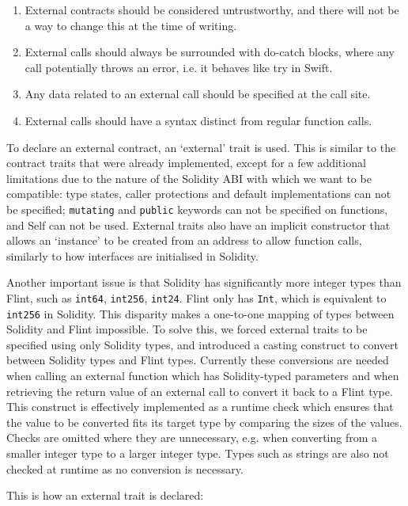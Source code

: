 \begin{enumerate}
	\item External contracts should be considered untrustworthy, and there will not be a way to change this at the time of writing.
	\item External calls should always be surrounded with do-catch blocks, where any call potentially throws an error, i.e. it behaves like try in Swift.
	\item Any data related to an external call should be specified at the call site.
	\item External calls should have a syntax distinct from regular function calls.
\end{enumerate}

To declare an external contract, an `external' trait is used. This is similar to the contract traits that were already implemented, except for a few additional limitations due to the nature of the Solidity ABI with which we want to be compatible: type states, caller protections and default implementations can not be specified; \texttt{mutating} and \texttt{public} keywords can not be specified on functions, and Self can not be used. External traits also have an implicit constructor that allows an `instance' to be created from an address to allow function calls, similarly to how interfaces are initialised in Solidity.

Another important issue is that Solidity has significantly more integer types than Flint, such as \texttt{int64}, \texttt{int256}, \texttt{int24}. Flint only has \texttt{Int}, which is equivalent to \texttt{int256} in Solidity. This disparity makes a one-to-one mapping of types between Solidity and Flint impossible. To solve this, we forced external traits to be specified using only Solidity types, and introduced a casting construct to convert between Solidity types and Flint types. Currently these conversions are needed when calling an external function which has Solidity-typed parameters and when retrieving the return value of an external call to convert it back to a Flint type. This construct is effectively implemented as a runtime check which ensures that the value to be converted fits its target type by comparing the sizes of the values. Checks are omitted where they are unnecessary, e.g. when converting from a smaller integer type to a larger integer type. Types such as strings are also not checked at runtime as no conversion is necessary.

This is how an external trait is declared:

